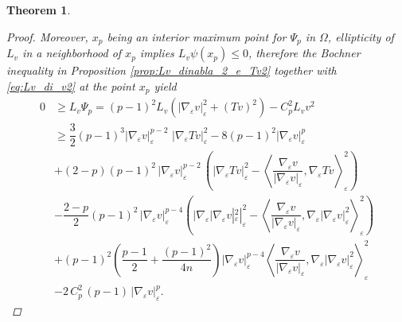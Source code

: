 \documentclass[10pt]{amsart}
\numberwithin{equation}{section}
\newtheorem{theorem}{Theorem}[section]
\theoremstyle{definition}
\begin{document}
\begin{theorem}
\begin{proof}
Moreover, $x_p$ being an interior maximum point for $\Psi_p$ in $\Omega$, ellipticity of $L_v$ in a neighborhood of $x_p$ implies $L_{v}\psi(x_p) \leq 0$, therefore the Bochner inequality in Proposition \ref{prop:Lv_dinabla_2_e_Tv2} together with \eqref{eq:Lv_di_v2} at the point $x_p$ yield 
\begin{equation}\label{eq:Lv_psi_p_negativo}
\begin{aligned}
				0 &\geq L_{v}\Psi_{p} =(p-1)^2 L_{v}(|\nabla_{\varepsilon}v|_{\varepsilon}^2 + (Tv)^2) - C_{p}^{2}L_{v}v^2 \\
				&\geq 
				\dfrac{3}{2}(p-1)^{3}|\nabla_{\varepsilon}v|_{\varepsilon}^{p-2} \,\, |\nabla_{\varepsilon}T v|_{\varepsilon}^2 - 8 (p-1)^{2} |\nabla_{\varepsilon}v|_{\varepsilon}^p\\
				&+ (2-p)(p-1)^2 \, |\nabla_{\varepsilon}v|_{\varepsilon}^{p-2} \, \left(|\nabla_{\varepsilon}T v|_{\varepsilon}^2 - \left\langle \dfrac{\nabla_{\varepsilon}v}{|\nabla_{\varepsilon}v|_{\varepsilon}}, \nabla_{\varepsilon}T v \right\rangle^{2}_{\varepsilon}\right)\\
				&-\dfrac{2-p}{2}(p-1)^{2}\, |\nabla_{\varepsilon}v|_{\varepsilon}^{p-4} \left(|\nabla_{\varepsilon}|\nabla_{\varepsilon}v|_{\varepsilon}^2|^2_{\varepsilon} - \left\langle \dfrac{\nabla_{\varepsilon}v}{|\nabla_{\varepsilon}v|_{\varepsilon}}, \nabla_{\varepsilon}|\nabla_{\varepsilon}v|_{\varepsilon}^2 \right\rangle_{\varepsilon}^2\right)\\
				& + (p-1)^{2}\left(\dfrac{p-1}{2} + \dfrac{(p-1)^2}{4n}\right)|\nabla_{\varepsilon}v|_{\varepsilon}^{p-4} \left\langle \dfrac{\nabla_{\varepsilon}v}{|\nabla_{\varepsilon}v|_{\varepsilon}}, \nabla_{\varepsilon}|\nabla_{\varepsilon}v|_{\varepsilon}^2\right\rangle_{\varepsilon}^2\\
				&-2 \, C_{p}^{2} \, (p-1) \, |\nabla_{\varepsilon}v|_{\varepsilon}^{p}.
\end{aligned}
\end{equation}


\end{proof}
\end{theorem}
\end{document}
